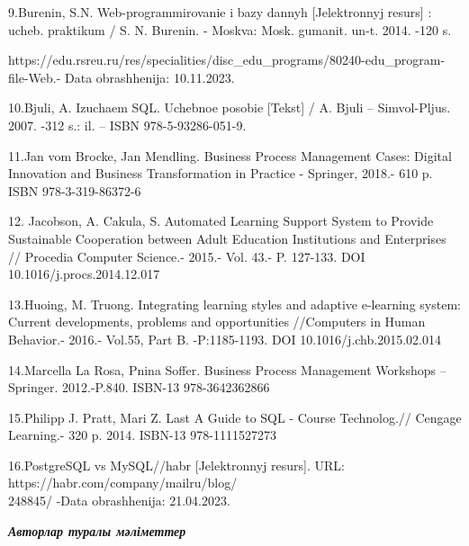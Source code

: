 \begin{noparindent}
9.Burenin, S.N. Web-programmirovanie i bazy dannyh {[}Jelektronnyj
resurs{]} : ucheb. praktikum / S. N. Burenin. - Moskva: Mosk. gumanit.
un-t. 2014. -120 s.

https://edu.rsreu.ru/res/specialities/disc\_edu\_programs/80240-edu\_program-file-Web.-
Data obrashhenija: 10.11.2023.

10.B\textquotesingle juli, A. Izuchaem SQL. Uchebnoe posobie {[}Tekst{]}
/ A. B\textquotesingle juli -- Simvol-Pljus. 2007. -312 s.: il. -- ISBN
978-5-93286-051-9.

11.Jan vom Brocke, Jan Mendling. Business Process Management Cases:
Digital Innovation and Business Transformation in Practice - Springer,
2018.- 610 p. ISBN 978-3-319-86372-6

12. Jacobson, A. Cakula, S. Automated Learning Support System to Provide
Sustainable Cooperation between Adult Education Institutions and
Enterprises // Procedia Computer Science.- 2015.- Vol. 43.- P. 127-133.
DOI 10.1016/j.procs.2014.12.017

13.Huoing, M. Truong. Integrating learning styles and adaptive
e-learning system: Current developments, problems and opportunities
//Computers in Human Behavior.- 2016.- Vol.55, Part B. -P:1185-1193. DOI
10.1016/j.chb.2015.02.014

14.Marcella La Rosa, Pnina Soffer. Business Process Management Workshops
-- Springer. 2012.-P.840. ISBN-13 978-3642362866

15.Philipp J. Pratt, Mari Z. Last A Guide to SQL - Course Technolog.//
Cengage Learning.- 320 p. 2014. ISBN-13 978-1111527273

16.PostgreSQL vs MySQL//habr {[}Jelektronnyj resurs{]}. URL:
https://habr.com/company/mailru/blog/\\248845/ -Data obrashhenija:
21.04.2023.

\end{noparindent}


\emph{{\bfseries Авторлар туралы мәліметтер}}


